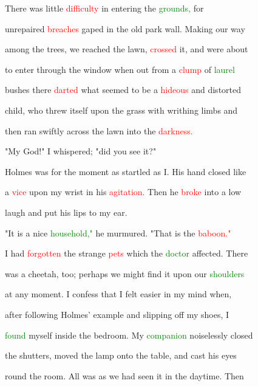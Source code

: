  There was little \textcolor{red}{difficulty} in entering the \textcolor{green}{grounds,} for

 unrepaired \textcolor{red}{breaches} gaped in the old park wall. Making our way

 among the \textcolor{BurntOrange}{trees,} we reached the lawn, \textcolor{red}{crossed} it, and were about

 to enter through the window when out from a \textcolor{red}{clump} of \textcolor{green}{laurel}

 bushes there \textcolor{red}{darted} what seemed to be a \textcolor{red}{hideous} and distorted

 \textcolor{BurntOrange}{child,} who threw itself upon the grass with writhing limbs and

 then ran swiftly across the lawn into the \textcolor{red}{darkness.}



 "My \textcolor{BurntOrange}{God!"} I whispered; "did you see it?"



 Holmes was for the moment as \textcolor{BurntOrange}{startled} as I. His hand closed like

 a \textcolor{red}{vice} upon my wrist in his \textcolor{red}{agitation.} Then he \textcolor{red}{broke} into a low

 \textcolor{BurntOrange}{laugh} and put his lips to my ear.



 "It is a nice \textcolor{green}{household,"} he murmured. "That is the \textcolor{red}{baboon."}



 I had \textcolor{red}{forgotten} the strange \textcolor{red}{pets} which the \textcolor{green}{doctor} affected. There

 was a cheetah, too; perhaps we might find it upon our \textcolor{green}{shoulders}

 at any moment. I \textcolor{BurntOrange}{confess} that I felt easier in my mind when,

 after following Holmes' example and \textcolor{BurntOrange}{slipping} off my shoes, I

 \textcolor{green}{found} myself inside the bedroom. My \textcolor{green}{companion} noiselessly closed

 the shutters, moved the lamp onto the table, and cast his eyes

 round the room. All was as we had seen it in the daytime. Then

